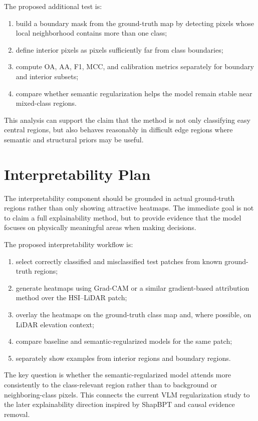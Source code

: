 \documentclass[10pt,journal,compsoc]{IEEEtran}
\begin{document}
The proposed additional test is:

\begin{enumerate}
    \item build a boundary mask from the ground-truth map by detecting pixels whose local neighborhood contains more than one class;
    \item define interior pixels as pixels sufficiently far from class boundaries;
    \item compute OA, AA, F1, MCC, and calibration metrics separately for boundary and interior subsets;
    \item compare whether semantic regularization helps the model remain stable near mixed-class regions.
\end{enumerate}

This analysis can support the claim that the method is not only classifying easy central regions, but also behaves reasonably in difficult edge regions where semantic and structural priors may be useful.

\section{Interpretability Plan}

The interpretability component should be grounded in actual ground-truth regions rather than only showing attractive heatmaps. The immediate goal is not to claim a full explainability method, but to provide evidence that the model focuses on physically meaningful areas when making decisions.

The proposed interpretability workflow is:

\begin{enumerate}
    \item select correctly classified and misclassified test patches from known ground-truth regions;
    \item generate heatmaps using Grad-CAM or a similar gradient-based attribution method over the HSI--LiDAR patch;
    \item overlay the heatmaps on the ground-truth class map and, where possible, on LiDAR elevation context;
    \item compare baseline and semantic-regularized models for the same patch;
    \item separately show examples from interior regions and boundary regions.
\end{enumerate}

The key question is whether the semantic-regularized model attends more consistently to the class-relevant region rather than to background or neighboring-class pixels. This connects the current VLM regularization study to the later explainability direction inspired by ShapBPT and causal evidence removal.
\end{document}
